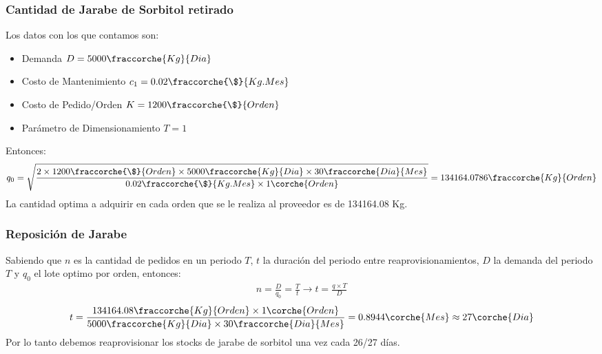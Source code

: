\begin{homeworkProblem}
\subsubsection{Cantidad de Jarabe de Sorbitol retirado}
Los datos con los que contamos son:
\begin{itemize}
    \item Demanda $D=5000\fraccorche{Kg}{Dia}$
    \item Costo de Mantenimiento $c_1=0.02\fraccorche{\$}{Kg.Mes}$
    \item Costo de Pedido/Orden $K=1200\fraccorche{\$}{Orden}$
    \item Parámetro de Dimensionamiento $T=1$
\end{itemize}
Entonces:
\begin{align*}
    q_0=\sqrt{
        \frac{
            2\times 1200\fraccorche{\$}{Orden}\times 5000\fraccorche{Kg}{Dia} \times 30\fraccorche{Dia}{Mes}
            }{
                0.02\fraccorche{\$}{Kg.Mes}\times 1\corche{Orden}
            }
        }
        =
        134164.0786\fraccorche{Kg}{Orden}
\end{align*}
La cantidad optima a adquirir en cada orden que se le realiza al proveedor es de 134164.08 Kg.

\subsubsection{Reposición de Jarabe}
Sabiendo que $n$ es la cantidad de pedidos en un periodo $T$, $t$ la duración del periodo entre reaprovisionamientos, $D$ la demanda del periodo $T$ y $q_0$ el lote optimo por orden, entonces:
\begin{align*}
    n=\frac{D}{q_0}=\frac{T}{t} \rightarrow t = \frac{q\times T}{D}
\end{align*}
\begin{align*}
    t = \frac{
            134164.08\fraccorche{Kg}{Orden}\times 1 \corche{Orden}
        }{
            5000\fraccorche{Kg}{Dia}\times 30\fraccorche{Dia}{Mes}
        } =  0.8944\corche{Mes} \approx 27\corche{Dia}       
\end{align*}
Por lo tanto debemos reaprovisionar los stocks de jarabe de sorbitol una vez cada 26/27 días.


\end{homeworkProblem}
